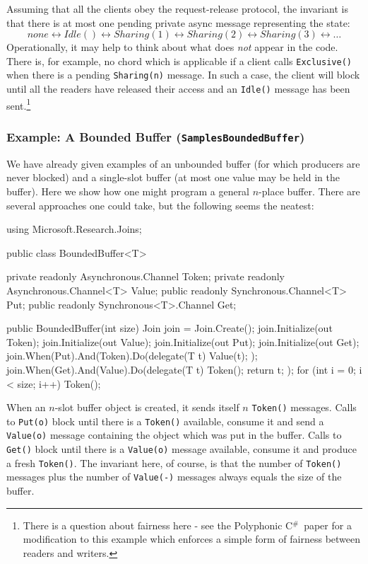 \documentclass{article}
\newcommand{\csharp}{\texorpdfstring{\mbox{C$^\#$}}{C\#}}
\newcommand{\sample}[1]{\texorpdfstring{{(\texttt{Samples{\symbol{92}}#1})}}{}}
\begin{document}
Assuming that all the clients obey the request-release protocol, the
invariant is that there is at most one pending private async message
representing the state:
\[
      none \leftrightarrow Idle() \leftrightarrow Sharing(1) 
\leftrightarrow Sharing(2) \leftrightarrow Sharing(3) \leftrightarrow\ldots
\]
Operationally, it may help to think about what does \emph{not} appear in the
code. There is, for example, no chord which is applicable if a client
calls \verb|Exclusive()| when there is a pending \verb|Sharing(n)| message. In such a
case, the client will block until all the readers have released their
access and an \verb|Idle()| message has been sent.\footnote{There is a question about
fairness here - see the Polyphonic \csharp\ paper \cite{polyphony-toplas} for a modification
to this example which enforces a simple form of fairness between
readers and writers.}

\subsubsection{Example: A Bounded Buffer \sample{BoundedBuffer}}

We have already given examples of an unbounded buffer
(for which producers are never blocked) and a single-slot buffer (at
most one value may be held in the buffer). Here we show how one might
program a general $n$-place buffer. There are several
approaches one could take, but the following seems the neatest:
\begin{lstcsharp}
  using Microsoft.Research.Joins;

  public class BoundedBuffer<T> {
    private readonly Asynchronous.Channel Token;
    private readonly Asynchronous.Channel<T> Value;
    public readonly Synchronous.Channel<T> Put;
    public readonly Synchronous<T>.Channel Get;

    public BoundedBuffer(int size) {
      Join join = Join.Create();
      join.Initialize(out Token);
      join.Initialize(out Value);
      join.Initialize(out Put);
      join.Initialize(out Get);
      join.When(Put).And(Token).Do(delegate(T t)
      {
        Value(t);
      });
      join.When(Get).And(Value).Do(delegate(T t)
      {
        Token();
        return t;
      });
      for (int i = 0; i < size; i++) {
        Token();
      }
    }
  }
\end{lstcsharp}

When an $n$-slot buffer object is created, it sends itself $n$
\verb|Token()| messages. Calls to \verb|Put(o)| block until there is a
\verb|Token()| available, consume it and send a \verb|Value(o)| message
containing the object which was put in the buffer. Calls to
\verb|Get()| block until there is a \verb|Value(o)| message available,
consume it and produce a fresh \verb|Token()|. The invariant here, of
course, is that the number of \verb|Token()| messages plus the number
of \verb|Value(-)| messages always equals the size of the buffer.
\end{document}
